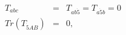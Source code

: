 \begin{equation}\label{FULLS}
\begin{array}{ccc}
T_{abc} & = & T_{ab{\dot 5}} = T_{a{\dot 5}b} = 0 \\
Tr ( T_{{\dot 5}AB} ) & = & 0,
\end{array}
\end{equation}

